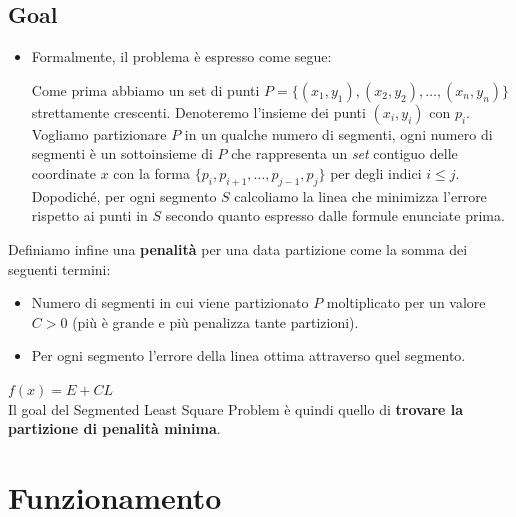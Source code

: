 \subsection{Goal}

\begin{itemize}
  \item
        Formalmente, il problema è espresso come segue:
        \begin{myblockquote}
          Come prima abbiamo un set di punti
          $P = \{(x_1, y_1), (x_2, y_2), \ldots, (x_n, y_n)\}$ strettamente
          crescenti. Denoteremo l'insieme dei punti
          $(x_i, y_i)$ con $p_i$.\\
          Vogliamo partizionare $P$ in un qualche numero di segmenti, ogni numero di segmenti è un
          sottoinsieme di $P$ che rappresenta un \emph{set} contiguo delle
          coordinate $x$ con la forma
          $\{p_i, p_{i+1}, \ldots, p_{j-1}, p_j\}$ per degli indici
          $i \leq j$.\\
          Dopodiché, per ogni segmento $S$ calcoliamo la linea che minimizza l'errore rispetto ai punti in $S$
          secondo quanto espresso dalle formule enunciate prima.
        \end{myblockquote}
\end{itemize}

Definiamo infine una \textbf{penalità} per una data partizione come la
somma dei seguenti termini:
\begin{itemize}
  \item Numero di segmenti in cui viene
        partizionato $P$ moltiplicato per un valore $C > 0$ (più è grande e
        più penalizza tante partizioni).
  \item Per ogni segmento l'errore della linea
        ottima attraverso quel segmento.
\end{itemize}

$f(x) = E + C L$\\

Il goal del Segmented Least Square Problem è quindi quello di
\textbf{trovare la partizione di penalità minima}.

\section{Funzionamento}

